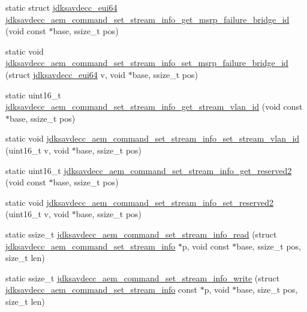 \begin{DoxyCompactItemize}
\item 
static struct \hyperlink{structjdksavdecc__eui64}{jdksavdecc\+\_\+eui64} \hyperlink{group__command__set__stream__info_ga672e0ad53bf3074052a9f9488ea327d7}{jdksavdecc\+\_\+aem\+\_\+command\+\_\+set\+\_\+stream\+\_\+info\+\_\+get\+\_\+msrp\+\_\+failure\+\_\+bridge\+\_\+id} (void const $\ast$base, ssize\+\_\+t pos)
\item 
static void \hyperlink{group__command__set__stream__info_ga694d29a01530f02fa2f82944581d6da1}{jdksavdecc\+\_\+aem\+\_\+command\+\_\+set\+\_\+stream\+\_\+info\+\_\+set\+\_\+msrp\+\_\+failure\+\_\+bridge\+\_\+id} (struct \hyperlink{structjdksavdecc__eui64}{jdksavdecc\+\_\+eui64} v, void $\ast$base, ssize\+\_\+t pos)
\item 
static uint16\+\_\+t \hyperlink{group__command__set__stream__info_gac0179bbd956d404db1995f395237a640}{jdksavdecc\+\_\+aem\+\_\+command\+\_\+set\+\_\+stream\+\_\+info\+\_\+get\+\_\+stream\+\_\+vlan\+\_\+id} (void const $\ast$base, ssize\+\_\+t pos)
\item 
static void \hyperlink{group__command__set__stream__info_ga9a9acf4ca20ed75b66b947184c287f49}{jdksavdecc\+\_\+aem\+\_\+command\+\_\+set\+\_\+stream\+\_\+info\+\_\+set\+\_\+stream\+\_\+vlan\+\_\+id} (uint16\+\_\+t v, void $\ast$base, ssize\+\_\+t pos)
\item 
static uint16\+\_\+t \hyperlink{group__command__set__stream__info_gae3b6666400123137edf1550ed0b1d539}{jdksavdecc\+\_\+aem\+\_\+command\+\_\+set\+\_\+stream\+\_\+info\+\_\+get\+\_\+reserved2} (void const $\ast$base, ssize\+\_\+t pos)
\item 
static void \hyperlink{group__command__set__stream__info_ga77a29f77739185bcacd16af35c41dd7d}{jdksavdecc\+\_\+aem\+\_\+command\+\_\+set\+\_\+stream\+\_\+info\+\_\+set\+\_\+reserved2} (uint16\+\_\+t v, void $\ast$base, ssize\+\_\+t pos)
\item 
static ssize\+\_\+t \hyperlink{group__command__set__stream__info_ga8295fbe9663536f6b26b3e815422a3f6}{jdksavdecc\+\_\+aem\+\_\+command\+\_\+set\+\_\+stream\+\_\+info\+\_\+read} (struct \hyperlink{structjdksavdecc__aem__command__set__stream__info}{jdksavdecc\+\_\+aem\+\_\+command\+\_\+set\+\_\+stream\+\_\+info} $\ast$p, void const $\ast$base, ssize\+\_\+t pos, size\+\_\+t len)
\item 
static ssize\+\_\+t \hyperlink{group__command__set__stream__info_gacd184f2efdcdb28691a2d1873067f6b8}{jdksavdecc\+\_\+aem\+\_\+command\+\_\+set\+\_\+stream\+\_\+info\+\_\+write} (struct \hyperlink{structjdksavdecc__aem__command__set__stream__info}{jdksavdecc\+\_\+aem\+\_\+command\+\_\+set\+\_\+stream\+\_\+info} const $\ast$p, void $\ast$base, size\+\_\+t pos, size\+\_\+t len)
\end{DoxyCompactItemize}


